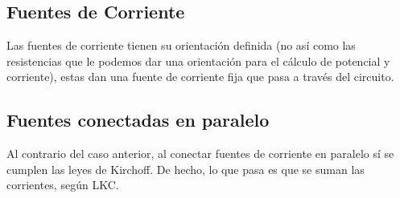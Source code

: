\subsection{Fuentes de Corriente}


Las fuentes de corriente tienen su orientación definida (no así como las resistencias que le podemos dar una orientación para el cálculo de potencial y corriente), estas dan una fuente de corriente fija que pasa a través del circuito.\\




\subsection{Fuentes conectadas en paralelo}


Al contrario del caso anterior, al conectar fuentes de corriente en paralelo sí se cumplen las leyes de Kirchoff. De hecho, lo que pasa es que se suman las corrientes, según LKC.



